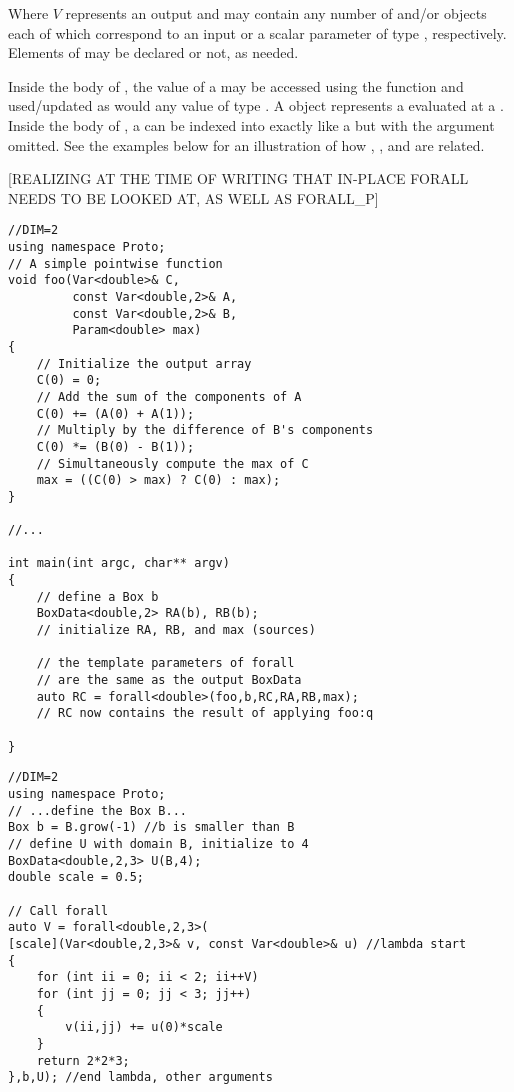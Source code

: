 \documentclass[12pt]{article}
\begin{document}
Where $V$ represents an output  and  may contain any number of  and/or  objects each of which correspond to an input  or a scalar parameter of type , respectively. Elements of  may be declared  or not, as needed.

Inside the body of , the value of a  may be accessed using the  function and used/updated as would any value of type . A  object represents a  evaluated at a . Inside the body of , a  can be indexed into exactly like a  but with the  argument omitted. See the examples below for an illustration of how , ,  and  are related. 

[REALIZING AT THE TIME OF WRITING THAT IN-PLACE FORALL NEEDS TO BE LOOKED AT, AS WELL AS FORALL\_P]

\begin{lstlisting}[caption=Forall Usage with External Function, label=lst-forall-foo]
//DIM=2
using namespace Proto;
// A simple pointwise function
void foo(Var<double>& C,
		 const Var<double,2>& A,
	     const Var<double,2>& B,
		 Param<double> max)
{
	// Initialize the output array
	C(0) = 0;
	// Add the sum of the components of A
	C(0) += (A(0) + A(1));
	// Multiply by the difference of B's components
	C(0) *= (B(0) - B(1));
	// Simultaneously compute the max of C
	max = ((C(0) > max) ? C(0) : max);
}

//...

int main(int argc, char** argv)
{
	// define a Box b
	BoxData<double,2> RA(b), RB(b);
	// initialize RA, RB, and max (sources)
	
	// the template parameters of forall
	// are the same as the output BoxData
	auto RC = forall<double>(foo,b,RC,RA,RB,max);
	// RC now contains the result of applying foo:q

}
\end{lstlisting}

\begin{lstlisting}[caption=Forall Usage With Lambda, label=lst-forall-lambda]
//DIM=2
using namespace Proto;
// ...define the Box B...
Box b = B.grow(-1) //b is smaller than B
// define U with domain B, initialize to 4
BoxData<double,2,3> U(B,4);
double scale = 0.5;

// Call forall
auto V = forall<double,2,3>(
[scale](Var<double,2,3>& v, const Var<double>& u) //lambda start
{
	for (int ii = 0; ii < 2; ii++V)
	for (int jj = 0; jj < 3; jj++)
	{
		v(ii,jj) += u(0)*scale
	}
	return 2*2*3;
},b,U); //end lambda, other arguments

\end{lstlisting}
\end{document}
